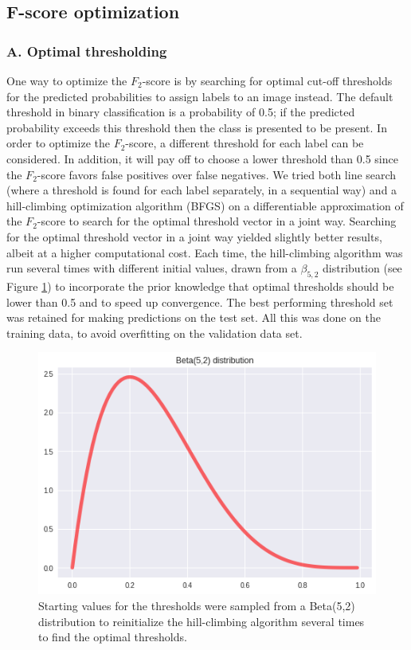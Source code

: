 \documentclass[fleqn]{homework}
\begin{document}
\subsection*{F-score optimization}
\subsubsection*{A. Optimal thresholding}
One way to optimize the $F_2$-score is by searching for optimal cut-off thresholds for the predicted probabilities to assign labels to an image instead. The default threshold in binary classification is a probability of 0.5; if the predicted probability exceeds this threshold then the class is presented to be present. In order to optimize the $F_2$-score, a different threshold for each label can be considered. In addition, it will pay off to choose a lower threshold than 0.5 since the $F_2$-score favors false positives over false negatives. We tried both line search (where a threshold is found for each label separately, in a sequential way) and a hill-climbing optimization algorithm (BFGS) on a differentiable approximation of the $F_2$-score to search for the optimal threshold vector in a joint way. Searching for the optimal threshold vector in a joint way yielded slightly better results, albeit at a higher computational cost. Each time, the hill-climbing algorithm was run several times with different initial values, drawn from a $\beta_{5,2}$ distribution (see Figure \ref{beta}) to incorporate the prior knowledge that optimal thresholds should be lower than 0.5 and to speed up convergence. The best performing threshold set was retained for making predictions on the test set. All this was done on the training data, to avoid overfitting on the validation data set. 

\begin{figure}[H]
	\centering
     \includegraphics[width=0.4\linewidth]{figures/beta.png}
	\caption{Starting values for the thresholds were sampled from a Beta(5,2) distribution to reinitialize the hill-climbing algorithm several times to find the optimal thresholds.}
	\label{beta} 
\end{figure}
\end{document}
